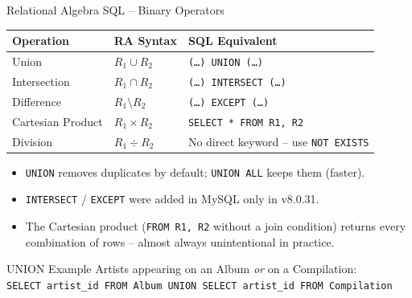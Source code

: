 \begin{frame}{Relational Algebra \textrightarrow{} SQL -- Binary Operators}
  \begin{center}
  \renewcommand{\arraystretch}{1.3}
  \begin{tabular}{@{}lll@{}}
    \toprule
    \textbf{Operation}    & \textbf{RA Syntax}       & \textbf{SQL Equivalent} \\
    \midrule
    Union             & $R_1 \cup R_2$           & \texttt{(\ldots) UNION (\ldots)} \\
    Intersection      & $R_1 \cap R_2$           & \texttt{(\ldots) INTERSECT (\ldots)} \\
    Difference        & $R_1 \setminus R_2$      & \texttt{(\ldots) EXCEPT (\ldots)} \\
    Cartesian Product & $R_1 \times R_2$         & \texttt{SELECT * FROM R1, R2} \\
    Division          & $R_1 \div R_2$           & No direct keyword -- use \texttt{NOT EXISTS} \\
    \bottomrule
  \end{tabular}
  \end{center}

  \begin{itemize}
    \item \texttt{UNION} removes duplicates by default; \texttt{UNION ALL} keeps them (faster).
    \item \texttt{INTERSECT} / \texttt{EXCEPT} were added in MySQL only in v8.0.31.
    \item The Cartesian product (\texttt{FROM R1, R2} without a join condition) returns every
          combination of rows -- almost always unintentional in practice.
  \end{itemize}

  \begin{exampleblock}{UNION Example}
    Artists appearing on an Album \emph{or} on a Compilation: \\[2pt]
    \texttt{SELECT artist\_id FROM Album UNION SELECT artist\_id FROM Compilation}
  \end{exampleblock}
\end{frame}

